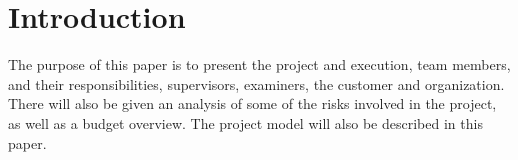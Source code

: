 \section{Introduction}

The purpose of this paper is to present the project and execution, team members, and their responsibilities, supervisors, examiners, the customer and organization. There will also be given an analysis of some of the risks involved in the project, as well as a budget overview. The project model will also be described in this paper. 
\\\\



